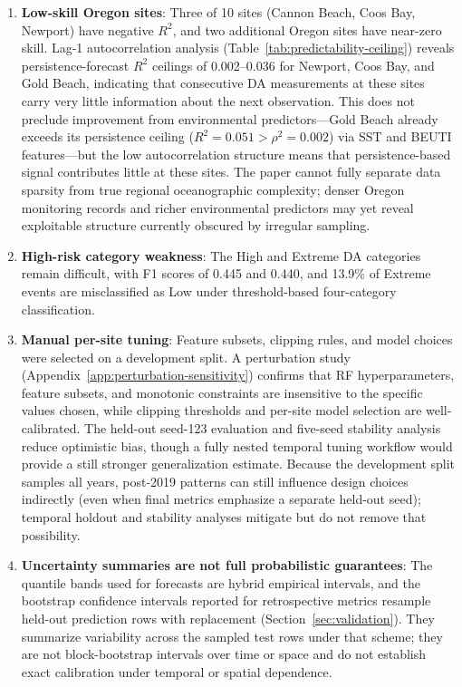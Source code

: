 \documentclass[toxins,article,submit,moreauthors]{Definitions/mdpi}
\begin{document}
\begin{enumerate}[nosep]
    \item \textbf{Low-skill Oregon sites}: Three of 10 sites (Cannon Beach, Coos Bay, Newport) have negative $R^2$, and two additional Oregon sites have near-zero skill. Lag-1 autocorrelation analysis (Table~\ref{tab:predictability-ceiling}) reveals persistence-forecast $R^2$ ceilings of 0.002--0.036 for Newport, Coos Bay, and Gold Beach, indicating that consecutive DA measurements at these sites carry very little information about the next observation. This does not preclude improvement from environmental predictors---Gold Beach already exceeds its persistence ceiling ($R^2 = 0.051 > \rho^2 = 0.002$) via SST and BEUTI features---but the low autocorrelation structure means that persistence-based signal contributes little at these sites. The paper cannot fully separate data sparsity from true regional oceanographic complexity; denser Oregon monitoring records and richer environmental predictors may yet reveal exploitable structure currently obscured by irregular sampling.
    \item \textbf{High-risk category weakness}: The High and Extreme DA categories remain difficult, with F1 scores of 0.445 and 0.440, and 13.9\% of Extreme events are misclassified as Low under threshold-based four-category classification.
    \item \textbf{Manual per-site tuning}: Feature subsets, clipping rules, and model choices were selected on a development split. A perturbation study (Appendix~\ref{app:perturbation-sensitivity}) confirms that RF hyperparameters, feature subsets, and monotonic constraints are insensitive to the specific values chosen, while clipping thresholds and per-site model selection are well-calibrated. The held-out seed-123 evaluation and five-seed stability analysis reduce optimistic bias, though a fully nested temporal tuning workflow would provide a still stronger generalization estimate. Because the development split samples all years, post-2019 patterns can still influence design choices indirectly (even when final metrics emphasize a separate held-out seed); temporal holdout and stability analyses mitigate but do not remove that possibility.
    \item \textbf{Uncertainty summaries are not full probabilistic guarantees}: The quantile bands used for forecasts are hybrid empirical intervals, and the bootstrap confidence intervals reported for retrospective metrics resample held-out prediction rows with replacement (Section~\ref{sec:validation}). They summarize variability across the sampled test rows under that scheme; they are not block-bootstrap intervals over time or space and do not establish exact calibration under temporal or spatial dependence.

\end{enumerate}
\end{document}
